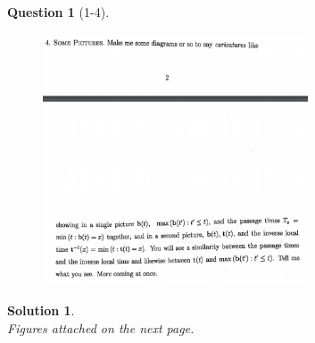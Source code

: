 \documentclass[11pt]{article}
\theoremstyle{plain}
\theoremstyle{quest}
\newtheorem*{question}{Question}
\newtheorem*{solution}{Solution}
\begin{document}
\begin{question}[1-4]
\hfill
\begin{figure}[h!]
  \centering
    \includegraphics[width=0.7\textwidth]{limthm2-f-p4.png}
\end{figure}
\end{question}
\begin{solution} \hfill \\
Figures attached on the next page.

\end{solution}

\newpage
\end{document}
